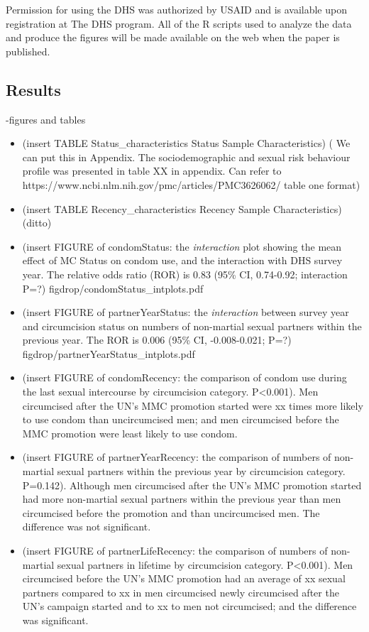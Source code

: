 \documentclass[12pt,]{article}
\begin{document}
Permission for using the DHS was authorized by USAID and is available
upon registration at The DHS program. All of the R scripts used to
analyze the data and produce the figures will be made available on the
web when the paper is published.

\subsection{Results}\label{results-1}

-figures and tables

\begin{itemize}
\item
  (insert TABLE Status\_characteristics Status Sample Characteristics) (
  We can put this in Appendix. The sociodemographic and sexual risk
  behaviour profile was presented in table XX in appendix. Can refer to
  https://www.ncbi.nlm.nih.gov/pmc/articles/PMC3626062/ table one
  format)
\item
  (insert TABLE Recency\_characteristics Recency Sample Characteristics)
  (ditto)
\item
  (insert FIGURE of condomStatus: the \emph{interaction} plot showing
  the mean effect of MC Status on condom use, and the interaction with
  DHS survey year. The relative odds ratio (ROR) is 0.83 (95\% CI,
  0.74-0.92; interaction P=?) figdrop/condomStatus\_intplots.pdf
\item
  (insert FIGURE of partnerYearStatus: the \emph{interaction} between
  survey year and circumcision status on numbers of non-martial sexual
  partners within the previous year. The ROR is 0.006 (95\% CI,
  -0.008-0.021; P=?) figdrop/partnerYearStatus\_intplots.pdf
\item
  (insert FIGURE of condomRecency: the comparison of condom use during
  the last sexual intercourse by circumcision category.
  P\textless{}0.001). Men circumcised after the UN's MMC promotion
  started were xx times more likely to use condom than uncircumcised
  men; and men circumcised before the MMC promotion were least likely to
  use condom.
\item
  (insert FIGURE of partnerYearRecency: the comparison of numbers of
  non-martial sexual partners within the previous year by circumcision
  category. P=0.142). Although men circumcised after the UN's MMC
  promotion started had more non-martial sexual partners within the
  previous year than men circumcised before the promotion and than
  uncircumcised men. The difference was not significant.
\item
  (insert FIGURE of partnerLifeRecency: the comparison of numbers of
  non-martial sexual partners in lifetime by circumcision category.
  P\textless{}0.001). Men circumcised before the UN's MMC promotion had
  an average of xx sexual partners compared to xx in men circumcised
  newly circumcised after the UN's campaign started and to xx to men not
  circumcised; and the difference was significant.
\end{itemize}
\end{document}
